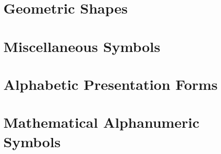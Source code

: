 \documentclass{article}
\begin{document}
\section{Geometric Shapes}

\section{Miscellaneous Symbols}

%
%
%
%
%
%
%
%
\section{Alphabetic Presentation Forms}

\section{Mathematical Alphanumeric Symbols}
\end{document}

